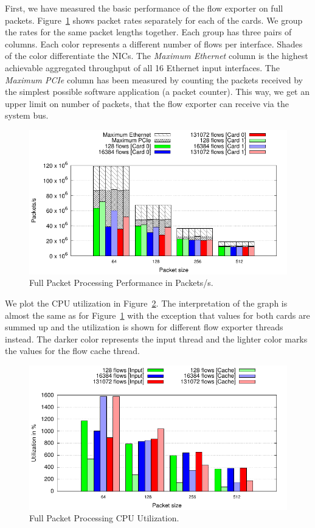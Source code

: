 First, we have measured the basic performance of the flow exporter on full packets. Figure~\ref{fig:pkt-full} shows packet rates separately for each of the cards. We group the rates for the same packet lengths together. Each group has three pairs of columns. Each color represents a different number of flows per interface. Shades of the color differentiate the NICs. The \emph{Maximum Ethernet} column is the highest achievable aggregated throughput of all 16 Ethernet input interfaces. The \emph{Maximum PCIe} column has been measured by counting the packets received by the simplest possible software application (a packet counter). This way, we get an upper limit on number of packets, that the flow exporter can receive via the system bus.

\begin{figure}[!htb]
    \centering 
    \includegraphics{figures/paper-highdensity/graphs/packets-full-cards.pdf}
    \caption{Full Packet Processing Performance in Packets/s.}
    \label{fig:pkt-full}
\end{figure}


We plot the CPU utilization in Figure~\ref{fig:cpu-full}. The interpretation of the graph is almost the same as for Figure~\ref{fig:pkt-full} with the exception that values for both cards are summed up and the utilization is shown for different flow exporter threads instead. The darker color represents the input thread and the lighter color marks the values for the flow cache thread.

\begin{figure}[!htb]
    \centering 
    \includegraphics{figures/paper-highdensity/graphs/cpu-full.pdf}
    \caption{Full Packet Processing CPU Utilization.}
    \label{fig:cpu-full}
\end{figure}

